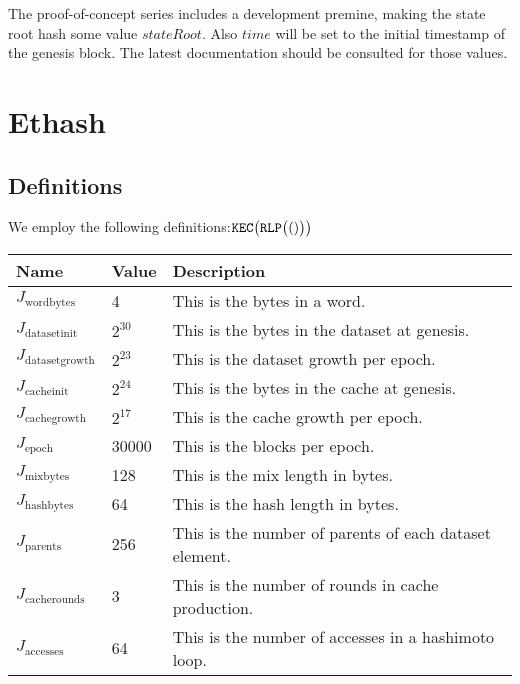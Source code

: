 \documentclass[9pt,oneside]{amsart}
\begin{document}
The proof-of-concept series includes a development premine, making the state root hash some value $stateRoot$. Also \hyperlink{H s}{$time$} will be set to the initial timestamp of the genesis block. The latest documentation should be consulted for those values.

\section{Ethash}\label{app:ethash}
\subsection{Definitions}
We employ the following definitions:$\mathtt{\tiny KEC}\big(\mathtt{\tiny RLP}\big( () \big)\big)$

\begin{tabu}{X[,l]X[,r]X[,l]}
\toprule
Name & Value & Description \hypertarget{Jwordbytes}{} \\
\midrule
$J_{\mathrm{wordbytes}}$ & 4  & This is the bytes in a word.\hypertarget{Jdatasetinit}{}\\
$J_{\mathrm{datasetinit}}$ & $2^{30}$ & This is the bytes in the dataset at genesis. \hypertarget{Jdatasetgrowth}{} \\
$J_{\mathrm{datasetgrowth}}$ & $2^{23}$ & This is the dataset growth per epoch. \hypertarget{Jcacheinit}{}\\
$J_{\mathrm{cacheinit}}$ & $2^{24}$ & This is the bytes in the cache at genesis.\hypertarget{Jcachegrowth}{}\\
$J_{\mathrm{cachegrowth}}$ & $2^{17}$ & This is the cache growth per epoch.\hypertarget{Jepoch}{}\\
$J_{\mathrm{epoch}}$ & 30000 & This is the blocks per epoch.\hypertarget{Jmixbytes}{}\\
$J_{\mathrm{mixbytes}}$ & 128 & This is the mix length in bytes.\hypertarget{Jhashbytes}{}\\
$J_{\mathrm{hashbytes}}$ & 64 & This is the hash length in bytes.\hypertarget{Jparents}{}\\
$J_{\mathrm{parents}}$ & 256 & This is the number of parents of each dataset element.\hypertarget{Jcacherounds}{}\\
$J_{\mathrm{cacherounds}}$ & 3 & This is the number of rounds in cache production.\hypertarget{Jaccesses}{}\\
$J_{\mathrm{accesses}}$ & 64 & This is the number of accesses in a hashimoto loop.\\
\bottomrule
\end{tabu}
\end{document}

